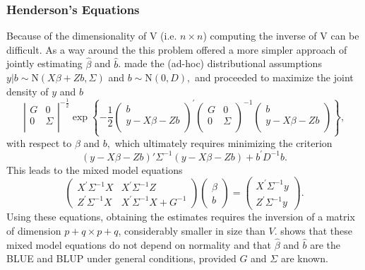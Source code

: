 \documentclass[12pt, a4paper]{report}
\theoremstyle{definition}
\theoremstyle{remark}
\begin{document}
\subsubsection{Henderson's Equations}
Because of the dimensionality of V (i.e. $n \times n$) computing the inverse of V can be difficult. As a way around the this problem \citet{Henderson53, Henderson59,Henderson63,Henderson73,Henderson84a} offered a more simpler approach of jointly estimating $\hat{\beta}$ and $\hat{b}$.
\cite{Henderson:1950} made the (ad-hoc) distributional assumptions $y|b \sim \mathrm{N} (X \beta + Zb, \Sigma)$ and $b \sim \mathrm{N}(0,D),$ and proceeded to maximize the joint density of $y$ and $b$
\begin{equation}
\left|
\begin{array}{cc}
G & 0 \\
0 & \Sigma \\
\end{array}
\right|^{-\frac{1}{2}}
\exp
\left\{ -\frac{1}{2}
\left(
\begin{array}{c}
b \\
y - X \beta -Zb \\
\end{array}
\right)^\prime
\left( \begin{array}{cc}
G & 0 \\
0 & \Sigma \\
\end{array}\right)^{-1}
\left(
\begin{array}{c}
b \\
y - X \beta -Zb \\
\end{array}
\right)
\right\},
\label{u&beta:JointDensity}
\end{equation}
with respect to $\beta$ and $b,$ which ultimately requires minimizing the criterion
\begin{equation}
(y - X \beta -Zb)'\Sigma^{-1}(y - X \beta -Zb) + b^\prime D^{-1}b.
\label{Henderson:Criterion}
\end{equation}
This leads to the mixed model equations
\begin{equation}
\left(\begin{array}{cc}
X^\prime\Sigma^{-1}X & X^\prime\Sigma^{-1}Z
\\
Z^\prime\Sigma^{-1}X & X^\prime\Sigma^{-1}X + G^{-1}
\end{array}\right)
\left(\begin{array}{c}
\beta \\
b
\end{array}\right)
=
\left(\begin{array}{c}
X^\prime\Sigma^{-1}y \\
Z^\prime\Sigma^{-1}y
\end{array}\right).
\label{Henderson:Equations}
\end{equation}
Using these equations, obtaining the estimates requires the inversion of a matrix
of dimension $p+q \times p+q$, considerably smaller in size than $V$. \citet{Henderson63} shows that these mixed model equations do not depend on normality and that $\hat{\beta}$ and $\hat{b}$ are the BLUE and BLUP under general conditions, provided $G$ and $\Sigma$ are known.
\end{document}
